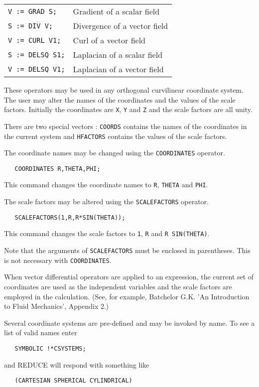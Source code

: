 \begin{tabular}{l l}
{\tt V := GRAD S;} & Gradient of a scalar field \\
{\tt S := DIV V;} & Divergence of a vector field \\
{\tt V := CURL V1;} & Curl of a vector field \\
{\tt S := DELSQ S1;} & Laplacian of a scalar field \\
{\tt V := DELSQ V1;} & Laplacian of a vector field \\
\end{tabular}

These operators may be used in any orthogonal curvilinear coordinate
system. The user may alter the names of the coordinates and the values
of the scale factors. Initially the coordinates are {\tt X}, {\tt Y}
and {\tt Z} and the scale factors are all unity.

 
There are two special vectors : {\tt COORDS} contains the names
of the coordinates in the current system and {\tt HFACTORS}
contains the values of the scale factors.

The coordinate names may be changed using the {\tt COORDINATES}
operator.
\begin{verbatim}
   COORDINATES R,THETA,PHI;
\end{verbatim}
This command changes the coordinate names to {\tt R}, {\tt THETA} and
{\tt PHI}.

The scale factors may be altered using the {\tt SCALEFACTORS} operator.
\begin{verbatim}
   SCALEFACTORS(1,R,R*SIN(THETA));
\end{verbatim}
This command changes the scale factors to {\tt 1}, {\tt R} and {\tt R
SIN(THETA)}.

Note that the arguments of {\tt SCALEFACTORS} must be enclosed in
parentheses. This is not necessary with {\tt COORDINATES}.


When vector differential operators are applied to an expression,
the current set of coordinates are used as the independent
variables and the scale factors are employed in the calculation.
(See, for example, Batchelor G.K. 'An Introduction to Fluid
Mechanics', Appendix 2.)


Several coordinate systems are pre-defined and may be invoked by
name. To see a list of valid names enter
\begin{verbatim}
   SYMBOLIC !*CSYSTEMS;
\end{verbatim}
and REDUCE will respond with something like
\begin{verbatim}
   (CARTESIAN SPHERICAL CYLINDRICAL)
\end{verbatim}

